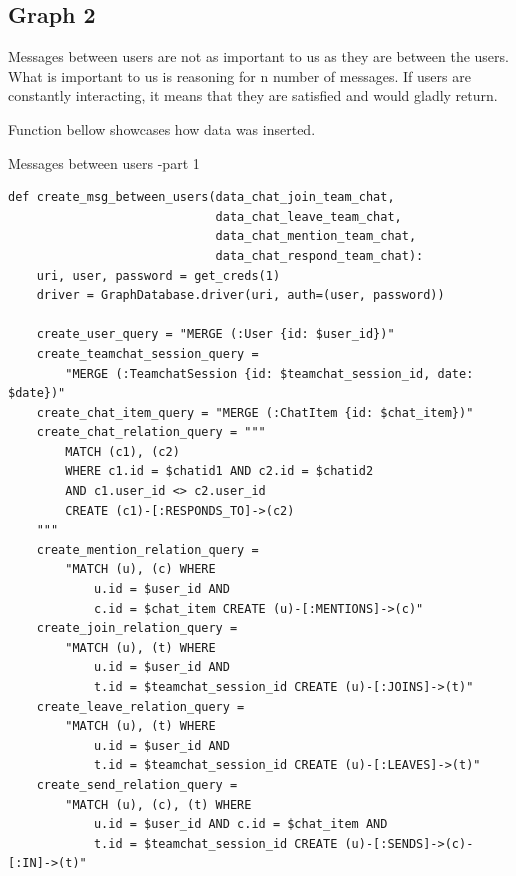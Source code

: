 \subsection{Graph 2}\label{Graph2}

Messages between users are not as important to us as they are between the users. What is important to us is reasoning for n number of messages. If users are constantly interacting, it means that they are satisfied and would gladly return. 

Function bellow showcases how data was inserted.
\begin{listing}[H]
\caption{Messages between users -part 1}
\begin{verbatim}
def create_msg_between_users(data_chat_join_team_chat, 
                             data_chat_leave_team_chat, 
                             data_chat_mention_team_chat, 
                             data_chat_respond_team_chat):
    uri, user, password = get_creds(1)
    driver = GraphDatabase.driver(uri, auth=(user, password))

    create_user_query = "MERGE (:User {id: $user_id})"
    create_teamchat_session_query = 
        "MERGE (:TeamchatSession {id: $teamchat_session_id, date: $date})"
    create_chat_item_query = "MERGE (:ChatItem {id: $chat_item})"
    create_chat_relation_query = """
        MATCH (c1), (c2) 
        WHERE c1.id = $chatid1 AND c2.id = $chatid2 
        AND c1.user_id <> c2.user_id 
        CREATE (c1)-[:RESPONDS_TO]->(c2)
    """
    create_mention_relation_query = 
        "MATCH (u), (c) WHERE 
            u.id = $user_id AND 
            c.id = $chat_item CREATE (u)-[:MENTIONS]->(c)"
    create_join_relation_query = 
        "MATCH (u), (t) WHERE 
            u.id = $user_id AND 
            t.id = $teamchat_session_id CREATE (u)-[:JOINS]->(t)"
    create_leave_relation_query = 
        "MATCH (u), (t) WHERE 
            u.id = $user_id AND 
            t.id = $teamchat_session_id CREATE (u)-[:LEAVES]->(t)"
    create_send_relation_query = 
        "MATCH (u), (c), (t) WHERE 
            u.id = $user_id AND c.id = $chat_item AND 
            t.id = $teamchat_session_id CREATE (u)-[:SENDS]->(c)-[:IN]->(t)"
\end{verbatim}
\end{listing}

